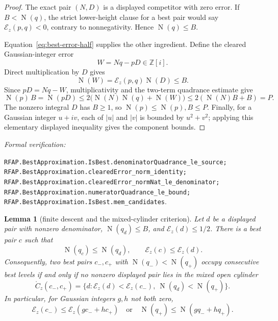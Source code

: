 \documentclass[11pt]{article}
\newtheorem{lemma}[lemma]{Lemma}
\newcommand{\Zi}{\mathbb{Z}[i]}
\newcommand{\Norm}[1]{\operatorname{N}\!\left(#1\right)}
\newcommand{\leanref}[1]{\par\smallskip\noindent
  \emph{Formal verification:}\par\nobreak
  {\raggedright\nolinkurl{#1}.\par}}
\begin{document}
\begin{proof}
The exact pair $(N,D)$ is a displayed competitor with zero error.  If
$B<\Norm q$, the strict lower-height clause for a best pair would say
$\mathcal E_z(p,q)<0$, contrary to nonnegativity.  Hence $\Norm q\le B$.

Equation~\eqref{eq:best-error-half} supplies the other ingredient.  Define
the cleared Gaussian-integer error
\begin{equation}
\label{eq:all-best-cleared-error}
                         W=Nq-pD\in\Zi.
\end{equation}
Direct multiplication by $D$ gives
\begin{equation}
\label{eq:all-best-cleared-norm}
             \Norm W=\mathcal E_z(p,q)\Norm D\le B.
\end{equation}
Since $pD=Nq-W$, multiplicativity and the two-term quadrance estimate give
\[
 \Norm p\,B
   =\Norm{pD}
   \le2\bigl(\Norm N\Norm q+\Norm W\bigr)
   \le2(\Norm N B+B)=P.
\]
The nonzero integral $D$ has $B\ge1$, so $\Norm p\le\Norm p,B\le P$.
Finally, for a Gaussian integer $u+iv$, each of $|u|$ and $|v|$ is bounded
by $u^2+v^2$; applying this elementary displayed inequality gives the
component bounds.
\end{proof}

\leanref{RFAP.BestApproximation.IsBest.denominatorQuadrance_le_source;
RFAP.BestApproximation.clearedError_norm_identity;
RFAP.BestApproximation.clearedError_normNat_le_denominator;
RFAP.BestApproximation.numeratorQuadrance_le_bound;
RFAP.BestApproximation.IsBest.mem_candidates}

\begin{lemma}[finite descent and the mixed-cylinder criterion]
\label{lem:mixed-cylinder-criterion}
Let $d$ be a displayed pair with nonzero denominator,
$\Norm{q_d}\le B$, and $\mathcal E_z(d)\le1/2$.  There is a best pair $c$
such that
\begin{equation}
\label{eq:finite-best-descent}
       \Norm{q_c}\le\Norm{q_d},
       \qquad \mathcal E_z(c)\le\mathcal E_z(d).
\end{equation}
Consequently, two best pairs $c_-,c_+$ with
$\Norm{q_-}<\Norm{q_+}$ occupy consecutive best levels if and only if no
nonzero displayed pair lies in the mixed open cylinder
\begin{equation}
\label{eq:mixed-open-cylinder}
 \mathring{C}_z(c_-,c_+)=
 \{d:\mathcal E_z(d)<\mathcal E_z(c_-),\
          \Norm{q_d}<\Norm{q_+}\}.
\end{equation}
In particular, for Gaussian integers $g,h$ not both zero,
\begin{equation}
\label{eq:linear-combination-exterior}
 \mathcal E_z(c_-)\le\mathcal E_z(gc_-+hc_+)
 \quad\text{or}\quad
 \Norm{q_+}\le\Norm{gq_-+hq_+}.
\end{equation}
\end{lemma}
\end{document}
